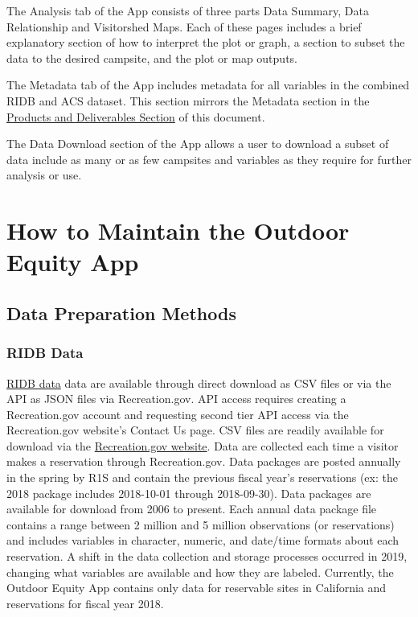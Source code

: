 \documentclass[
]{book}
\begin{document}
The Analysis tab of the App consists of three parts Data Summary, Data Relationship and Visitorshed Maps. Each of these pages includes a brief explanatory section of how to interpret the plot or graph, a section to subset the data to the desired campsite, and the plot or map outputs.

The Metadata tab of the App includes metadata for all variables in the combined RIDB and ACS dataset. This section mirrors the Metadata section in the \protect\hyperlink{products-and-deliverables}{Products and Deliverables Section} of this document.

The Data Download section of the App allows a user to download a subset of data include as many or as few campsites and variables as they require for further analysis or use.

\hypertarget{how-to-maintain-the-outdoor-equity-app}{%
\section{How to Maintain the Outdoor Equity App}\label{how-to-maintain-the-outdoor-equity-app}}

\hypertarget{data-preparation-methods}{%
\subsection{Data Preparation Methods}\label{data-preparation-methods}}

\hypertarget{ridb-data}{%
\subsubsection{RIDB Data}\label{ridb-data}}

\href{https://ridb.recreation.gov/landing}{RIDB data} data are available through direct download as CSV files or via the API as JSON files via Recreation.gov. API access requires creating a Recreation.gov account and requesting second tier API access via the Recreation.gov website's Contact Us page. CSV files are readily available for download via the \href{https://ridb.recreation.gov/download}{Recreation.gov website}. Data are collected each time a visitor makes a reservation through Recreation.gov. Data packages are posted annually in the spring by R1S and contain the previous fiscal year's reservations (ex: the 2018 package includes 2018-10-01 through 2018-09-30). Data packages are available for download from 2006 to present. Each annual data package file contains a range between 2 million and 5 million observations (or reservations) and includes variables in character, numeric, and date/time formats about each reservation. A shift in the data collection and storage processes occurred in 2019, changing what variables are available and how they are labeled. Currently, the Outdoor Equity App contains only data for reservable sites in California and reservations for fiscal year 2018.
\end{document}
